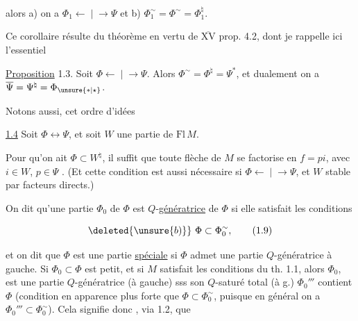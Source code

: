 alors a) on a $\Phi_1 \mathrel{\longleftarrow\!\mid\!\longrightarrow} \Psi$ et b) $\Phi_1^{\sim}=\Phi^{\sim}=\Phi_1^{\natural}$.

Ce corollaire résulte du théorème en vertu de
\uline{$\overline{\mathrm{XV}}$} prop. 4.2, dont je rappelle ici l'essentiel

\uline{Proposition} 1.3. Soit $\Phi \mathrel{\longleftarrow\!\mid\!\longrightarrow} \Psi$. Alors
$\Phi^{\sim}=\Phi^{\natural}=\Psi^{*}$, et dualement on a $\overline{\Psi}=\Psi^{\natural}=\Phi_{\unsure{*|\star}}$.

Notons aussi,  cet ordre d'idées

\uline{ 1.4} Soit $\Phi\longleftrightarrow\Psi$, et soit $W$
une partie  de $\mathrm{Fl}\,M$. 

Pour qu'on ait $\Phi\subset W^{\natural}$, il suffit que
toute flèche de $M$ se factorise en $f=pi$,
avec $i\in W$, $p\in\Psi$ . (Et cette condition
est  aussi nécessaire si $\Phi \mathrel{\longleftarrow\!\mid\!\longrightarrow} \Psi$, et $W$
stable par facteurs directs.)

On dit qu'une partie $\Phi_0$ de $\Phi$ est 
$Q$-\uline{génératrice} de $\Phi$ si elle satisfait les conditions


\[
\deleted{\unsure{b)}}\ \Phi\subset\Phi_0^{\sim},\tag*{(1.9)}
\]

et on dit que $\Phi$ est une partie \uline{spéciale} 
si $\Phi$ admet une  partie $Q$-génératrice à gauche.
Si $\Phi_0\subset\Phi$ est petit, et si $M$ satisfait les
conditions du th. 1.1, alors $\Phi_0$, est une
partie $Q$-génératrice (à gauche) sss son
$Q$-saturé total (à g.) $\Phi_0'''$ contient $\Phi$
(condition en apparence plus forte que $\Phi\subset\Phi_0^{\sim}$,
puisque en général on a $\Phi_0'''\subset\Phi_0^{\sim}$). Cela
signifie donc , via 1.2, que 
